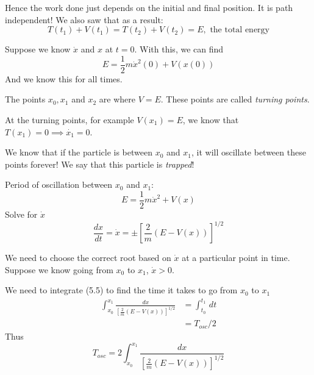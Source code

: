 \documentclass[10pt]{scrartcl}
\begin{document}
Hence the work done just depends on the initial and final position. It is path independent! We also saw that as a result:
\[T(t_1) + V(t_1) = T(t_2) + V(t_2) = E, \text{ the total energy}\]



\begin{center}
\end{center}



Suppose we know $\dot{x}$ and $x$ at $t = 0$. With this, we can find
\[E = \frac{1}{2}m\dot{x}^2(0) + V(x(0))\]
And we know this for all times.~\\

\begin{definition} The points $x_0,x_1$ and $x_2$ are where $V = E$. These points are called \emph{turning points}.
	
\end{definition}
At the turning points, for example $V(x_1) = E$, we know that $T(x_1) = 0 \implies \dot{x_1} = 0$. 

We know that if the particle is between $x_0$ and $x_1$, it will oscillate between these points forever! We say that this particle is \emph{trapped}!

Period of oscillation between $x_0$ and $x_1$:
\[E = \frac{1}{2}m\dot{x}^2 + V(x)\]
Solve for $\dot{x}$
\begin{equation}\frac{dx}{dt} = \dot{x} = \pm\left[\frac{2}{m}(E-V(x))\right]^{1/2}\end{equation}

We need to choose the correct root based on $\dot{x}$ at a particular point in time. Suppose we know going from $x_0$ to $x_1$, $\dot{x} >0$. 

We need to integrate (5.5) to find the time it takes to go from $x_0$ to $x_1$
\[\begin{aligned}\int_{x_0}^{x_1}\frac{dx}{\left[\frac{2}{m}(E-V(x))\right]^{1/2}} &= \int_{t_0}^{t_1} \,dt\\
&= T_{osc}/2	
\end{aligned}
 \]
 Thus
 \begin{equation}
 T_{osc} = 2\int_{x_0}^{x_1}\frac{dx}{\left[\frac{2}{m}(E-V(x))\right]^{1/2}}
\end{equation}
	
\end{document}
